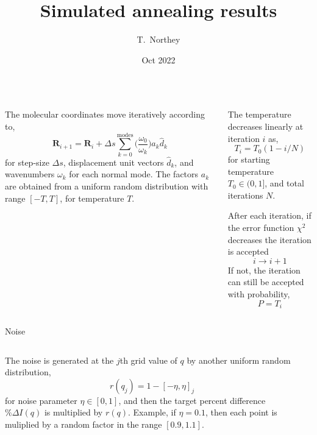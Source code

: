 \documentclass{beamer}
\title{Simulated annealing results}
\author{T.\ Northey}
\date{Oct 2022}
\begin{document}
\begin{frame}[plain]
    \maketitle
\end{frame}

\begin{frame}
\begin{columns}
	\begin{column}{0.5\textwidth}
		The molecular coordinates move iteratively according to,
		\[
			\textbf{R}_{i+1} = \textbf{R}_{i} + \Delta s\sum_{k=0}^{\textrm{modes}} \Big(\frac{\omega_0}{\omega_k}\Big) a_k\hat{d}_k
		\]
		for step-size $\Delta s$, displacement unit vectors $\hat{d}_k$, and wavenumbers $\omega_k$ for each normal mode. The factors $a_k$ are obtained from a uniform random distribution with range $[-T, T]$, for temperature $T$.
	\end{column}
	\begin{column}{0.5\textwidth}
		The temperature decreases linearly at iteration $i$ as,
		\[
			T_i = T_0(1 - i / N)
		\]
		for starting temperature $T_0\in(0, 1]$, and total iterations $N$.

		After each iteration, if the error function $\chi^2$ decreases the iteration is accepted
		\[
		i\rightarrow i+1
		\]
		If not, the iteration can still be accepted with probability,
		\[
		P = T_i
		\]
	\end{column}
\end{columns}
\end{frame}

\begin{frame}{Noise}
\begin{columns}
	\begin{column}{0.5\textwidth}
		The noise is generated at the $j$th grid value of $q$ by another uniform random distribution,
		\[
			r(q_j) = 1 - [-\eta, \eta]_j
		\]
		for noise parameter $\eta\in[0, 1]$, and then the target percent difference $\%\Delta I(q)$ is multiplied by $r(q)$. Example, if $\eta = 0.1$, then each point is muliplied by a random factor in the range $[0.9, 1.1]$.
	\end{column}
	\begin{column}{0.5\textwidth}

	\end{column}
\end{columns}
\end{frame}
\end{document}

